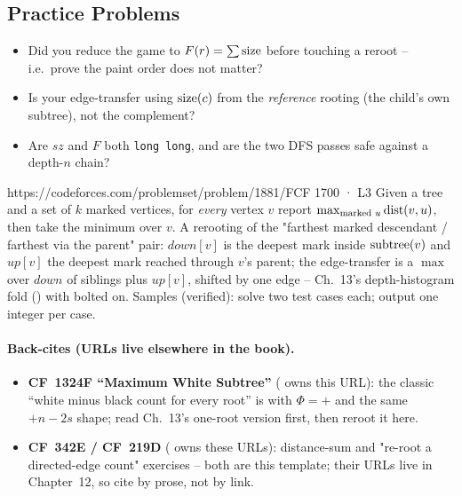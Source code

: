 \subsection{Practice Problems}

\begin{stuckbox}
\begin{itemize}[nosep, leftmargin=1.4em]
  \item Did you reduce the game to $F(r)=\sum\operatorname{size}$ before touching a reroot --
        i.e.\ prove the paint order does not matter?
  \item Is your edge-transfer using $\operatorname{size}(c)$ from the \emph{reference} rooting
        (the child's own subtree), not the complement?
  \item Are $\mathit{sz}$ and $F$ both \lstinline{long long}, and are the two
        DFS passes safe against a depth-$n$ chain?
\end{itemize}
\end{stuckbox}

\begin{practiceset}
    {https://codeforces.com/problemset/problem/1881/F}{CF 1700 · L3}
    {Given a tree and a set of $k$ marked vertices, for \emph{every} vertex $v$
    report $\max_{\text{marked } u} \operatorname{dist}(v,u)$, then take the minimum over $v$.
    A rerooting of the "farthest marked descendant / farthest via the parent"
    pair: $\mathit{down}[v]$ is the deepest mark inside $\operatorname{subtree}(v)$ and
    $\mathit{up}[v]$ the deepest mark reached through $v$'s parent; the
    edge-transfer is a $\max$ over $\mathit{down}$ of siblings plus
    $\mathit{up}[v]$, shifted by one edge -- Ch.~13's depth-histogram fold
    () with  bolted on. Samples
    (verified): solve two test cases each; output one integer per case.
    }
\end{practiceset}

\paragraph{Back-cites (URLs live elsewhere in the book).}
\begin{itemize}[nosep,leftmargin=1.4em]
  \item \textbf{CF~1324F ``Maximum White Subtree''} ( owns this URL):
        the classic ``white minus black count for every root'' is
         with $\Phi=+$ and the same $+n-2s$ shape;
        read Ch.~13's one-root version first, then reroot it here.
  \item \textbf{CF~342E / CF~219D} ( owns these URLs): distance-sum
        and "re-root a directed-edge count" exercises -- both are this template;
        their URLs live in Chapter~12, so cite by prose, not by link.
\end{itemize}

